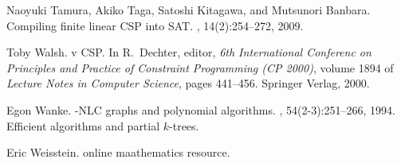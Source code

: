 \documentclass[10pt,usletter]{article}
\theoremstyle{remark}
\begin{document}
\begin{thebibliography}{10}
Naoyuki Tamura, Akiko Taga, Satoshi Kitagawa, and Mutsunori Banbara.
\newblock Compiling finite linear {CSP} into {SAT}.
, 14(2):254--272, 2009.

Toby Walsh.
 v {CSP}.
\newblock In R.~Dechter, editor, {\em 6th International Conferenc on Principles
  and Practice of Constraint Programming (CP 2000)}, volume 1894 of {\em
  Lecture Notes in Computer Science}, pages 441--456. Springer Verlag, 2000.

Egon Wanke.
-{NLC} graphs and polynomial algorithms.
, 54(2-3):251--266, 1994.
\newblock Efficient algorithms and partial $k$-trees.

Eric Weisstein.
 online maathematics resource.

\end{thebibliography}
\end{document}
